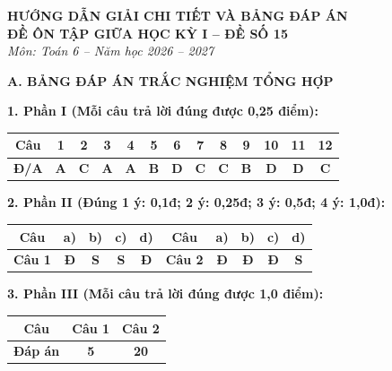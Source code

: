\documentclass[12pt,a4paper]{article}
\begin{document}
\begin{center}
  \textbf{\Large HƯỚNG DẪN GIẢI CHI TIẾT VÀ BẢNG ĐÁP ÁN}\\
  \textbf{\large ĐỀ ÔN TẬP GIỮA HỌC KỲ I -- ĐỀ SỐ 15}\\
  \textit{Môn: Toán 6 -- Năm học 2026 -- 2027}
\end{center}
\vspace{2mm}

\noindent\textbf{\large A. BẢNG ĐÁP ÁN TRẮC NGHIỆM TỔNG HỢP}
\vspace{1.5mm}

\noindent\textbf{1. Phần I (Mỗi câu trả lời đúng được 0,25 điểm):}
\begin{center}
\begin{tabular}{|c|c|c|c|c|c|c|c|c|c|c|c|c|}
\hline
\textbf{Câu} & \textbf{1} & \textbf{2} & \textbf{3} & \textbf{4} & \textbf{5} & \textbf{6} & \textbf{7} & \textbf{8} & \textbf{9} & \textbf{10} & \textbf{11} & \textbf{12} \\
\hline
\textbf{Đ/A} & \textbf{A} & \textbf{C} & \textbf{A} & \textbf{A} & \textbf{B} & \textbf{D} & \textbf{C} & \textbf{C} & \textbf{B} & \textbf{D} & \textbf{D} & \textbf{C} \\
\hline
\end{tabular}
\end{center}
\vspace{1mm}

\noindent\textbf{2. Phần II (Đúng 1 ý: 0,1đ; 2 ý: 0,25đ; 3 ý: 0,5đ; 4 ý: 1,0đ):}
\begin{center}
\begin{tabular}{|c|c|c|c|c||c|c|c|c|c|}
\hline
\textbf{Câu} & \textbf{a)} & \textbf{b)} & \textbf{c)} & \textbf{d)} & \textbf{Câu} & \textbf{a)} & \textbf{b)} & \textbf{c)} & \textbf{d)} \\
\hline
\textbf{Câu 1} & \textbf{Đ} & \textbf{S} & \textbf{S} & \textbf{Đ} & \textbf{Câu 2} & \textbf{Đ} & \textbf{Đ} & \textbf{Đ} & \textbf{S} \\
\hline
\end{tabular}
\end{center}
\vspace{1mm}

\noindent\textbf{3. Phần III (Mỗi câu trả lời đúng được 1,0 điểm):}
\begin{center}
\begin{tabular}{|c|c|c|}
\hline
\textbf{Câu} & \textbf{Câu 1} & \textbf{Câu 2} \\
\hline
\textbf{Đáp án} & \textbf{5} & \textbf{20} \\
\hline
\end{tabular}
\end{center}
\vspace{3mm}
\end{document}
